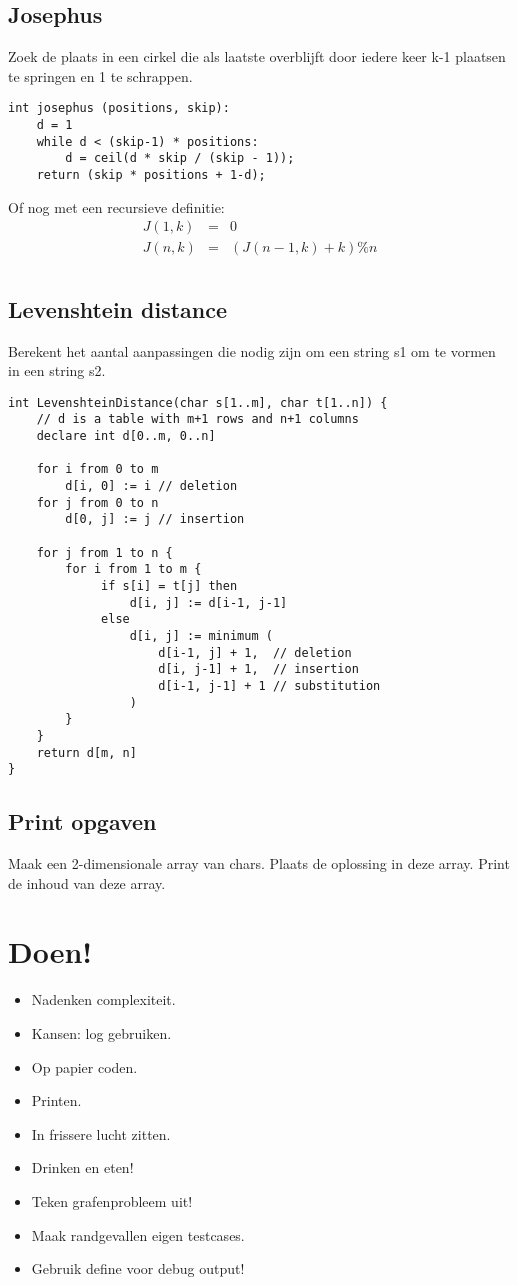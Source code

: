 \documentclass[a4paper,10pt,oneside]{report}
\begin{document}
\section{Josephus}
Zoek de plaats in een cirkel die als laatste overblijft door iedere
keer k-1 plaatsen te springen en 1 te schrappen.
\begin{verbatim}
int josephus (positions, skip):
	d = 1
    while d < (skip-1) * positions:
        d = ceil(d * skip / (skip - 1));
    return (skip * positions + 1-d);
\end{verbatim}

Of nog met een recursieve definitie:
\begin{eqnarray*}
J(1, k) & = & 0 \\
J(n, k) & = & (J(n-1, k) + k) \% n \\
\end{eqnarray*}

\section{Levenshtein distance}
Berekent het aantal aanpassingen die nodig zijn om een string s1 om te vormen in
een string s2.

\begin{verbatim}
int LevenshteinDistance(char s[1..m], char t[1..n]) {
    // d is a table with m+1 rows and n+1 columns
    declare int d[0..m, 0..n]

    for i from 0 to m
        d[i, 0] := i // deletion
    for j from 0 to n
        d[0, j] := j // insertion

    for j from 1 to n {
        for i from 1 to m {
             if s[i] = t[j] then 
                 d[i, j] := d[i-1, j-1]
             else
                 d[i, j] := minimum (
                     d[i-1, j] + 1,  // deletion
                     d[i, j-1] + 1,  // insertion
                     d[i-1, j-1] + 1 // substitution
                 )
        }
    }
    return d[m, n]
}
\end{verbatim}

\section{Print opgaven}
Maak een 2-dimensionale array van chars. Plaats de oplossing in deze array. Print
de inhoud van deze array.

\chapter{Doen!}

\begin{itemize}
\item Nadenken complexiteit.
\item Kansen: log gebruiken.
\item Op papier coden.
\item Printen.
\item In frissere lucht zitten.
\item Drinken en eten!
\item Teken grafenprobleem uit!
\item Maak randgevallen eigen testcases.
\item Gebruik define voor debug output!
\end{itemize}
\end{document}

